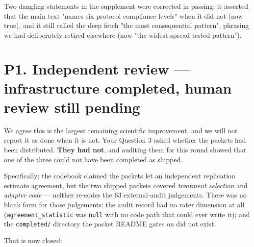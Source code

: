 \documentclass[11pt,a4paper]{article}
\begin{document}
Two dangling statements in the supplement were corrected in passing: it asserted that the main text "names six protocol compliance levels" when it did not (now true), and it still called the deep fetch "the most consequential pattern", phrasing we had deliberately retired elsewhere (now "the widest-spread tested pattern").

\section*{P1. Independent review --- infrastructure completed, human review still pending}

We agree this is the largest remaining scientific improvement, and we will not report it as done when it is not. Your Question 3 asked whether the packets had been distributed. \textbf{They had not}, and auditing them for this round showed that one of the three could not have been completed as shipped.

Specifically: the codebook claimed the packets let an independent replication estimate agreement, but the two shipped packets covered \emph{treatment selection} and \emph{adapter code} --- neither re-codes the 63 external-audit judgements. There was no blank form for those judgements; the audit record had no rater dimension at all (\texttt{agreement\_statistic} was \texttt{null} with no code path that could ever write it); and the \texttt{completed/} directory the packet README gates on did not exist.

That is now closed:
\end{document}

